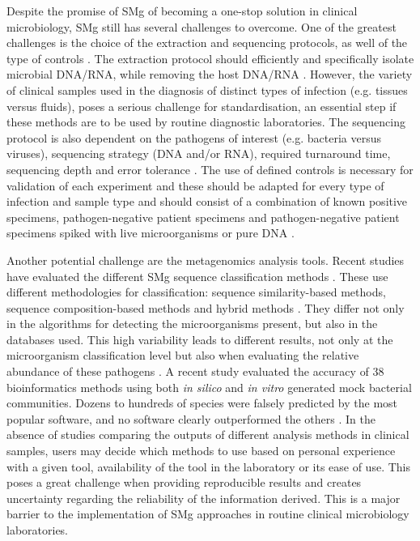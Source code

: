 Despite the promise of \ac{SMg} of becoming a one-stop solution in clinical microbiology, \ac{SMg} still has several challenges to overcome. 
One of the greatest challenges is the choice of the extraction and sequencing protocols, as well of the type of controls \citep{schlaberg_validation_2017}. 
The extraction protocol should efficiently and specifically isolate microbial DNA/RNA, while removing the host DNA/RNA \citep{street_molecular_2017}. 
However, the variety of clinical samples used in the diagnosis of distinct types of infection (e.g. tissues versus fluids), poses a serious challenge for standardisation, an essential step if these methods are to be used by routine diagnostic laboratories. 
The sequencing protocol is also dependent on the pathogens of interest (e.g. bacteria versus viruses), sequencing strategy (DNA and/or RNA), required turnaround time, sequencing depth and error tolerance \citep{schlaberg_validation_2017}. The use of defined controls is necessary for validation of each experiment and these should be adapted for every type of infection and sample type and should consist of a combination of known positive specimens, pathogen-negative patient specimens and pathogen-negative patient specimens spiked with live microorganisms or pure DNA \citep{schlaberg_validation_2017}.

Another potential challenge are the metagenomics analysis tools. 
Recent studies have evaluated the different \ac{SMg} sequence classification methods \citep{peabody_evaluation_2015}. 
These use different methodologies for classification: sequence similarity-based methods, sequence composition-based methods and hybrid methods \citep{peabody_evaluation_2015}. 
They differ not only in the algorithms for detecting the microorganisms present, but also in the databases used. 
This high variability leads to different results, not only at the microorganism classification level but also when evaluating the relative abundance of these pathogens \citep{peabody_evaluation_2015}. 
A recent study evaluated the accuracy of 38 bioinformatics methods using both \textit{in silico} and \textit{in vitro} generated mock bacterial communities.
Dozens to hundreds of species were falsely predicted by the most popular software, and no software clearly outperformed the others \citep{peabody_evaluation_2015}. 
In the absence of studies comparing the outputs of different analysis methods in clinical samples, users may decide which methods to use based on personal experience with a given tool, availability of the tool in the laboratory or its ease of use.
This poses a great challenge when providing reproducible results and creates uncertainty regarding the reliability of the information derived. This is a major barrier to the implementation of \ac{SMg} approaches in routine clinical microbiology laboratories.

